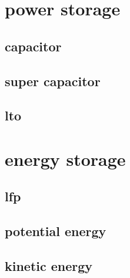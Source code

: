 \section{power storage}
\subsection{capacitor}
\subsection{super capacitor}
\subsection{lto}
\section{energy storage}
\subsection{lfp}
\subsection{potential energy}
\subsection{kinetic energy}








